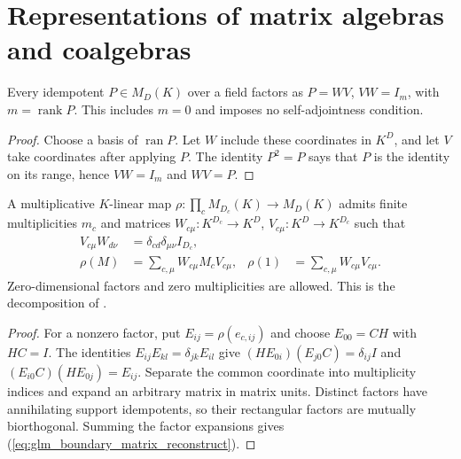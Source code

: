 \section{Representations of matrix algebras and coalgebras}

\begin{lemma}
    \label{thm:glm_boundary_idempotent}
    \leanok
    Every idempotent $P\in M_D(K)$ over a field factors as $P=WV$,
    $VW=I_m$, with $m=\operatorname{rank}P$. This includes $m=0$ and
    imposes no self-adjointness condition.
\end{lemma}

\begin{proof}
    \leanok
    Choose a basis of $\operatorname{ran}P$. Let $W$ include these
    coordinates in $K^D$, and let $V$ take coordinates after applying $P$.
    The identity $P^2=P$ says that $P$ is the identity on its range, hence
    $VW=I_m$ and $WV=P$.
\end{proof}

\begin{lemma}
    \label{thm:glm_boundary_matrix_blocks}
    \leanok
    A multiplicative $K$-linear map $\rho\colon\prod_c M_{D_c}(K)\to M_D(K)$
    admits finite multiplicities $m_c$ and matrices
    $W_{c\mu}\colon K^{D_c}\to K^D$, $V_{c\mu}\colon K^D\to K^{D_c}$ such that
    \begin{align}
        V_{c\mu}W_{d\nu}
                & =\delta_{cd}\delta_{\mu\nu}I_{D_c},
        \label{eq:glm_boundary_matrix_orthogonal}       \\
        \rho(M) & =\sum_{c,\mu}W_{c\mu}M_cV_{c\mu},   &
        \rho(1) & =\sum_{c,\mu}W_{c\mu}V_{c\mu}.
        \label{eq:glm_boundary_matrix_reconstruct}
    \end{align}
    Zero-dimensional factors and zero multiplicities are allowed. This is
    the decomposition of \cite[Appendix~A]{GarreRubio2023MPOSym}.
\end{lemma}

\begin{proof}
    \leanok
    For a nonzero factor, put $E_{ij}=\rho(e_{c,ij})$ and choose
    $E_{00}=CH$ with $HC=I$. The identities
    $E_{ij}E_{kl}=\delta_{jk}E_{il}$ give
    $(HE_{0i})(E_{j0}C)=\delta_{ij}I$ and
    $(E_{i0}C)(HE_{0j})=E_{ij}$. Separate the common coordinate into
    multiplicity indices and expand an arbitrary matrix in matrix units.
    Distinct factors have annihilating support idempotents, so their
    rectangular factors are mutually biorthogonal. Summing the factor
    expansions gives (\ref{eq:glm_boundary_matrix_reconstruct}).
\end{proof}

